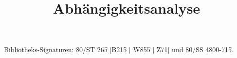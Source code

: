 \documentclass[a4paper,10pt,ngerman]{scrartcl}
\title{Abhängigkeitsanalyse}
\begin{document}
\maketitle

\tableofcontents
\newpage












\appendix

{}
\nocite{Ban93}
\nocite{Ban94}
\nocite{Ban97}
\nocite{Fea91}
\nocite{Len93}
\nocite{Pugh95a}
\nocite{Wol89}
\nocite{Wol95}
\nocite{Zima90}



Bibliotheks-Signaturen: 80/ST 265 [B215 $|$ W855 $|$ Z71] und 80/SS 4800-715.
\end{document}
